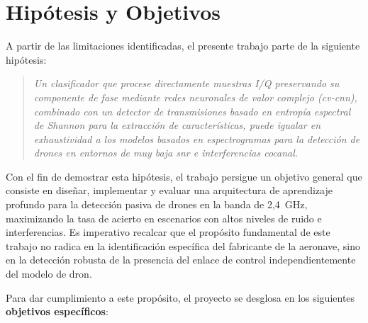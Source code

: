 \section{Hipótesis y Objetivos}
\label{sec:hipotesis_objetivos}

A partir de las limitaciones identificadas, el presente trabajo parte de la siguiente hipótesis:

\begin{quote}
\textit{Un clasificador que procese directamente muestras I/Q preservando su componente de fase mediante redes neuronales de valor complejo (\gls{cv-cnn}), combinado con un detector de transmisiones basado en entropía espectral de Shannon para la extracción de características, puede igualar en exhaustividad a los modelos basados en espectrogramas para la detección de drones en entornos de muy baja \gls{snr} e interferencias cocanal.}
\end{quote}

Con el fin de demostrar esta hipótesis, el trabajo persigue un objetivo general que consiste en diseñar, implementar y evaluar una arquitectura de aprendizaje profundo para la detección pasiva de drones en la banda de 2,4~GHz, maximizando la tasa de acierto en escenarios con altos niveles de ruido e interferencias. Es imperativo recalcar que el propósito fundamental de este trabajo no radica en la identificación específica del fabricante de la aeronave, sino en la detección robusta de la presencia del enlace de control independientemente del modelo de dron.

Para dar cumplimiento a este propósito, el proyecto se desglosa en los siguientes \textbf{objetivos específicos}:

